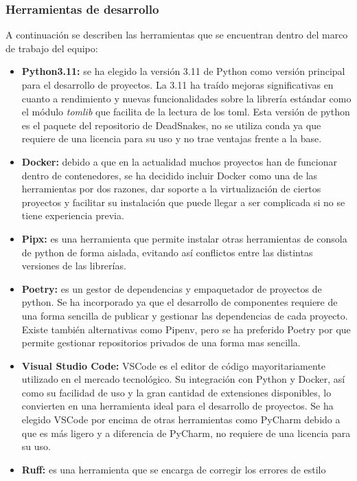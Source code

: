 \subsubsection{Herramientas de desarrollo}
A continuación se describen las herramientas que se encuentran dentro del marco
de trabajo del equipo:
\begin{itemize}
    \item \textbf{Python3.11:} se ha elegido la versión 3.11 de Python como versión
    principal para el desarrollo de proyectos. La 3.11 ha traído mejoras significativas
    en cuanto a rendimiento y nuevas funcionalidades sobre la librería estándar como
    el módulo \textit{tomlib} que facilita de la lectura de los toml. Esta versión
    de python es el paquete del repositorio de DeadSnakes, no se utiliza conda ya
    que requiere de una licencia para su uso y no trae ventajas frente a la base.
    \item \textbf{Docker:} debido a que en la actualidad muchos proyectos han de funcionar
    dentro de contenedores, se ha decidido incluir Docker como una de las herramientas por
    dos razones, dar soporte a la virtualización de ciertos proyectos y facilitar su instalación
    que puede llegar a ser complicada si no se tiene experiencia previa.
    \item \textbf{Pipx:} es una herramienta que permite instalar otras herramientas de 
    consola de python de forma aislada, evitando así conflictos entre las distintas 
    versiones de las librerías.
    \item \textbf{Poetry:} es un gestor de dependencias y empaquetador de proyectos de python.
    Se ha incorporado ya que el desarrollo de componentes requiere de una forma sencilla de
    publicar y gestionar las dependencias de cada proyecto. Existe también alternativas como
    Pipenv, pero se ha preferido Poetry por que permite gestionar repositorios privados de una
    forma mas sencilla.  
    \item \textbf{Visual Studio Code:} VSCode es el editor de código mayoritariamente utilizado
    en el mercado tecnológico. Su integración con Python y Docker, así como su facilidad de uso
    y la gran cantidad de extensiones disponibles, lo convierten en una herramienta ideal para
    el desarrollo de proyectos. Se ha elegido VSCode por encima de otras herramientas como PyCharm
    debido a que es más ligero y a diferencia de PyCharm, no requiere de una licencia para su uso.
    \item \textbf{Ruff:} es una herramienta que se encarga de corregir los errores de estilo

\end{itemize}
